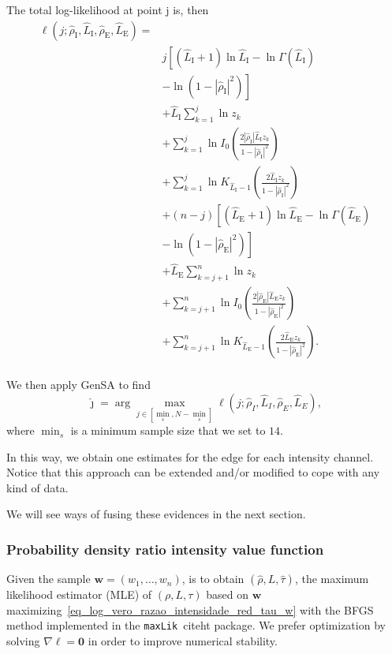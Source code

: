 \documentclass[journal]{IEEEtran}
\begin{document}
The total log-likelihood at point j is, then
\begin{equation}\label{eq:TotalLogLikelihood_prod_mag}
\begin{split}
\ell(j;\widehat{\rho}_\text{I}, \widehat{L}_\text{I}, \widehat{\rho}_\text{E}, \widehat{L}_\text{E})=\\
      & j\left[(\widehat{L}_\text{I}+1)\ln \widehat{L}_\text{I}-\ln\Gamma(\widehat{L}_\text{I})\right.\\
      &\left.-\ln(1-|\widehat{\rho}_\text{I}|^2)\right]
\\
      &+\widehat{L}_\text{I}\sum_{k=1}^{j} \ln z_k\\
      &+\sum_{k=1}^{j}\ln I_0\left(\frac{2|\widehat{\rho}_\text{I}|\widehat{L}_\text{I} z_k}{1-|\widehat{\rho}_\text{I}|^2}\right)\\
      &+ \sum_{k=1}^{j}\ln K_{\widehat{L}_\text{I}-1}\left(\frac{2\widehat{L}_\text{I}z_k}{1-|\widehat{\rho}_\text{I}|^2}\right)\\
      &+(n-j)\left[(\widehat{L}_\text{E}+1)\ln \widehat{L}_\text{E}-\ln\Gamma(\widehat{L}_\text{E})\right.\\
      &\left.-\ln(1-|\widehat{\rho}_\text{E}|^2)\right]\\
      &+\widehat{L}_\text{E}\sum_{k=j+1}^{n} \ln z_k\\
      &+\sum_{k=j+1}^{n}\ln I_0\left(\frac{2|\widehat{\rho}_\text{E}|\widehat{L}_\text{E} z_k}{1-|\widehat{\rho}_\text{E}|^2}\right)\\
      &+ \sum_{k=j+1}^{n}\ln K_{\widehat{L}_\text{E}-1}\left(\frac{2\widehat{L}_\text{E} z_k}{1-|\widehat{\rho}_\text{E}|^2}\right).\\
\end{split}
\end{equation}



We then apply GenSA to find  
$$
\widehat{\jmath}= \arg\max\limits_{j\in [\min_s,N-\min_s]}\ell(j;\widehat{\rho}_I, \widehat{L}_I,\widehat{\rho}_E, \widehat{L}_E),
$$ 
where $\min_s$ is a minimum sample size that we set to $14$.

In this way, we obtain one estimates for the edge for each intensity channel.
Notice that this approach can be extended and/or modified to cope with any kind of data.

We will see ways of fusing these evidences in the next section.


\subsubsection{Probability density ratio intensity value function}
Given the sample $\bm w = (w_1,\dots,w_n)$, is to obtain $(\widehat \rho, L, \widehat \tau)$, the maximum likelihood estimator (MLE) of $(\rho, L, \tau)$ based on $\bm w$ maximizing~\eqref{eq_log_vero_razao_intensidade_red_tau_w} with the BFGS method implemented in the \texttt{maxLik}~cite{ht} package. We prefer optimization by solving $\nabla\ell=\bm 0$ in order to improve numerical stability.
\end{document}
